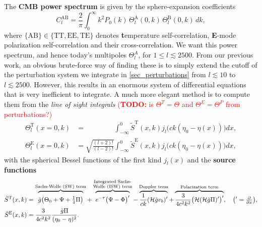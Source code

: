 \documentclass[10pt,a4paper]{article}
\newcommand\TODO[1]{\textcolor{red}{(\textbf{TODO:} #1)}}
\begin{document}
The \textbf{CMB power spectrum} is given by the sphere-expansion coefficients
\begin{equation}
	C^{\textrm{AB}}_l = \frac{2}{\pi} \int_0^\infty k^2 P_0(k) \, \Theta_l^\text{A}(0,k) \, \Theta_l^\text{B}(0,k) \, dk,
\label{eq_Cl}
\end{equation}
where $\{\text{AB}\} \in \{\text{TT},\text{EE},\text{TE}\}$ denotes \textbf{t}emperature self-correlation, \textbf{E}-mode polarization self-correlation and their cross-correlation.
We want this power spectrum, and hence today's multipoles $\Theta^A_l$, for $1 \leq l \lesssim 2500$.
From our previous work,
an obvious brute-force way of finding these is to simply extend the cutoff of the perturbation system we integrate in \cref{sec_perturbations} from $l \lesssim 10$ to $l \lesssim 2500$.
However, this results in an enormous system of differential equations that is very inefficient to integrate.
A much more elegant method is to compute them from the \emph{line of sight integrals}
\TODO{is $\Theta^T = \Theta$ and $\Theta^E = \Theta^P$ from perturbations?}
\begin{subequations}
\begin{align}
	\Theta^\text{T}_l(x=0,k) &= \phantom{\sqrt{\frac{(l+2)!}{(l-2)!}}} \int_{-\infty}^0 \tilde{S}^\text{T}(x,k) j_l\big(ck(\eta_0-\eta(x))\big) dx, \\
	\Theta^\text{E}_l(x=0,k) &= \sqrt{\frac{(l+2)!}{(l-2)!}} \int_{-\infty}^0 \tilde{S}^\text{E}(x,k) j_l\big(ck(\eta_0-\eta(x))\big) dx,
\end{align}
\label{eq_Thetal0}
\end{subequations}
with the spherical Bessel functions of the first kind $j_l(x)$ and the \textbf{source functions}
\begin{subequations}
\begin{align}
	\tilde{S}^\text{T}(x,k) &= \overbrace{\vphantom{\frac1c} \tilde{g} \big( \Theta_0 + \Psi + \tfrac14 \Pi \big)}^\text{Sachs-Wolfe (SW) term} + \overbrace{\vphantom{\frac1c} e^{-\tau} \big( \Psi - \Phi \big)^\prime}^{\substack{\text{Integrated Sachs-}\\\text{Wolfe (ISW) term}}} - \overbrace{\frac{1}{ck} (\mathcal{H} \tilde{g} v_b)^\prime}^{\text{Doppler term}} + \overbrace{\frac{3}{4c^2k^2} \big( \mathcal{H} (\mathcal{H} \tilde{g} \Pi)^\prime \big)^\prime}^{\text{Polarization term}}, \quad \big( {}^\prime = \tfrac{\partial}{\partial x} \big), \\
	\tilde{S}^\text{E}(x,k) &= \frac{3}{4 c^2 k^2} \frac{\tilde{g} \Pi}{(\eta_0-\eta)^2}.
\end{align}
\label{eq_S}
\end{subequations}
\end{document}
